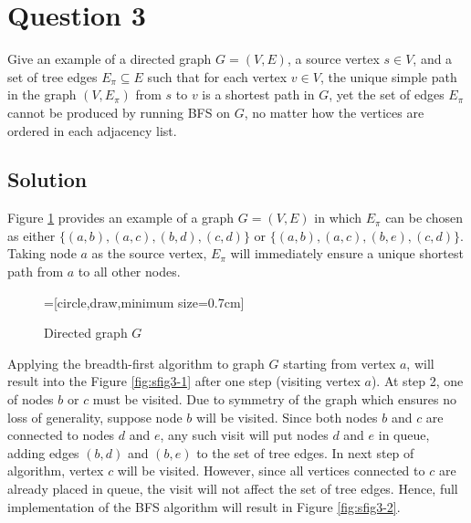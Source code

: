 

\section*{Question 3}

Give an example of a directed graph $G = (V, E)$, a source vertex $s \in V$, and a set of tree edges $E_\pi \subseteq E$ such that for each vertex $v \in V$, the unique simple path in the graph $(V, E_\pi)$ from $s$ to $v$ is a shortest path in $G$, yet the set of edges $E_\pi$ cannot be produced by running BFS on $G$, no matter how the vertices are ordered in each adjacency list.

\subsection*{Solution}

Figure \ref{fig31} provides an example of a graph $G = (V, E)$ in which $E_\pi$ can be chosen as either $\{(a,b), (a,c), (b,d), (c,d)\}$ or $\{(a,b), (a,c), (b,e), (c,d)\}$.
Taking node $a$ as the source vertex, $E_\pi$ will immediately ensure a unique shortest path from $a$ to all other nodes.

\begin{figure}[H]\centering
{}=[circle,draw,minimum size=0.7cm]
\caption{Directed graph $G$}\label{fig31}
\end{figure}

Applying the breadth-first algorithm to graph $G$ starting from vertex $a$, will result into the Figure \ref{fig:sfig3-1} after one step (visiting vertex $a$).
At step 2, one of nodes $b$ or $c$ must be visited.
Due to symmetry of the graph which ensures no loss of generality, suppose node $b$ will be visited.
Since both nodes $b$ and $c$ are connected to nodes $d$ and $e$, any such visit will put nodes $d$ and $e$ in queue, adding edges $(b,d)$ and $(b,e)$ to the set of tree edges.
In next step of algorithm, vertex $c$ will be visited.
However, since all vertices connected to $c$ are already placed in queue, the visit will not affect the set of tree edges.
Hence, full implementation of the BFS algorithm will result in Figure \ref{fig:sfig3-2}.


